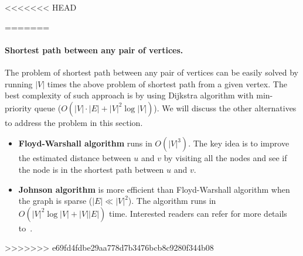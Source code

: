 <<<<<<< HEAD

=======
\paragraph{Shortest path between any pair of vertices.}
The problem of shortest path between any pair of vertices can be easily solved
by running $|V|$ times the above problem of shortest path from a given vertex.
The best complexity of such approach is by using Dijkstra algorithm with min-
priority queue ($O(|V|\cdot|E|+|V|^2\log|V|)$). We will discuss the other
alternatives to address the problem in this section.
	\begin{itemize}	
	\squish
		\item {\bf Floyd-Warshall algorithm} runs in $O(|V|^3)$. The key idea is
		to improve the estimated distance between $u$ and $v$ by visiting all
		the nodes and see if the node is in the shortest path between $u$ and
		$v$.

	 	\item {\bf Johnson algorithm} is more efficient than Floyd-Warshall
	 	algorithm when the graph is sparse ($|E| \ll |V|^2$). The algorithm
	 	runs in $O(|V|^2\log|V| + |V||E|)$ time. Interested readers can refer for
	 	more details to~\cite{johnson-alg}.
	\end{itemize}
>>>>>>> e69fd4fdbe29aa778d7b3476bcb8c9280f344b08

